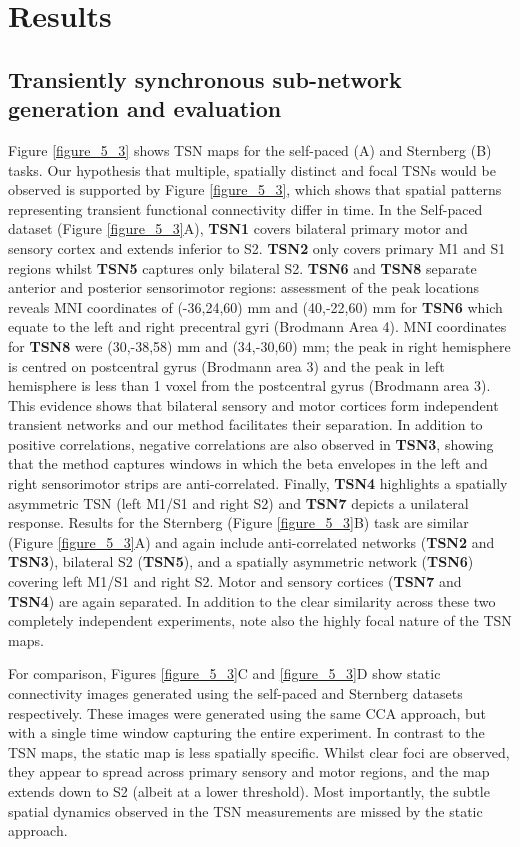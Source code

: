 \section{Results}
\subsection{Transiently synchronous sub-network generation and evaluation}

Figure \ref{figure_5_3} shows TSN maps for the self-paced (A) and Sternberg (B) tasks. Our hypothesis that multiple, spatially distinct and focal TSNs would be observed is supported by Figure \ref{figure_5_3}, which shows that spatial patterns representing transient functional connectivity differ in time. In the Self-paced dataset (Figure \ref{figure_5_3}A), \textbf{TSN1} covers bilateral primary motor and sensory cortex and extends inferior to S2. \textbf{TSN2} only covers primary M1 and S1 regions whilst \textbf{TSN5} captures only bilateral S2. \textbf{TSN6} and \textbf{TSN8} separate anterior and posterior sensorimotor regions: assessment of the peak locations reveals MNI coordinates of (-36,24,60) mm and (40,-22,60) mm for \textbf{TSN6} which equate to the left and right precentral gyri (Brodmann Area 4). MNI coordinates for \textbf{TSN8} were (30,-38,58) mm and (34,-30,60) mm; the peak in right hemisphere is centred on postcentral gyrus (Brodmann area 3) and the peak in left hemisphere is less than 1 voxel from the postcentral gyrus (Brodmann area 3). This evidence shows that bilateral sensory and motor cortices form independent transient networks and our method facilitates their separation. In addition to positive correlations, negative correlations are also observed in \textbf{TSN3}, showing that the method captures windows in which the beta envelopes in the left and right sensorimotor strips are anti-correlated. Finally, \textbf{TSN4} highlights a spatially asymmetric TSN (left M1/S1 and right S2) and \textbf{TSN7} depicts a unilateral response. Results for the Sternberg (Figure \ref{figure_5_3}B) task are similar (Figure \ref{figure_5_3}A) and again include anti-correlated networks (\textbf{TSN2} and \textbf{TSN3}), bilateral S2 (\textbf{TSN5}), and a spatially asymmetric network (\textbf{TSN6}) covering left M1/S1 and right S2. Motor and sensory cortices (\textbf{TSN7} and \textbf{TSN4}) are again separated. In addition to the clear similarity across these two completely independent experiments, note also the highly focal nature of the TSN maps. 

For comparison, Figures \ref{figure_5_3}C and \ref{figure_5_3}D show static connectivity images generated using the self-paced and Sternberg datasets respectively. These images were generated using the same CCA approach, but with a single time window capturing the entire experiment.  In contrast to the TSN maps, the static map is less spatially specific. Whilst clear foci are observed, they appear to spread across primary sensory and motor regions, and the map extends down to S2 (albeit at a lower threshold).  Most importantly, the subtle spatial dynamics observed in the TSN measurements are missed by the static approach.

